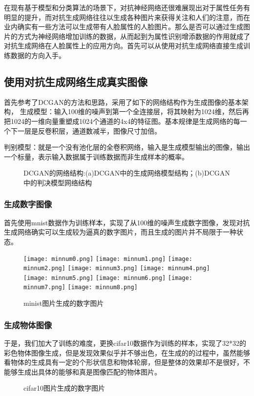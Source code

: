 在现有基于模型和分类算法的场景下，对抗神经网络还很难展现出对于属性任务有明显的提升，而对抗生成网络往往以生成各种图片来获得关注和人们的注意，而在业内确实有一些方法可以生成带有人脸属性的人脸图片。那么是否可以通过生成图片的方式为神经网络增加训练的数据，从而起到为属性识别增添数据的作用就成了对抗生成网络在人脸属性上的应用方向。首先可以从使用对抗生成网络直接生成训练数据的方向入手。
\subsection{使用对抗生成网络生成真实图像}
首先参考了DCGAN\cite{DCGAN}的方法和思路，采用了如下的网络结构作为生成图像的基本架构， 生成模型：输入100维的噪声到第一个全连接层，将其映射为1024维，然后再把1024的一维向量重塑成1024个通道的4x4的特征图。基本规律是生成网络的每一个下一层是反卷积层，通道数减半，图像尺寸加倍。

判别模型：就是一个没有池化层的全卷积网络，输入是生成模型输出的图像，输出一个标量，表示输入数据属于训练数据而非生成样本的概率。
\begin{figure}[h]
  \centering
  \caption{DCGAN的网络结构:(a)DCGAN中的生成网络模型结构；(b)DCGAN中的判决模型网络结构}
\end{figure}

\subsubsection{生成数字图像}
首先使用mnist数据\cite{MNIST}作为训练样本，实现了从100维的噪声生成数字图像，发现对抗生成网络确实可以生成较为逼真的数字图片，而且生成的图片并不局限于一种状态。
\begin{figure}[!ht]
 \centering 
	\texttt{[image: minnum0.png]}
	\texttt{[image: minnum1.png]}
	\texttt{[image: minnum2.png]}
	\texttt{[image: minnum3.png]}
	\texttt{[image: minnum4.png]}
	\texttt{[image: minnum5.png]}
	\texttt{[image: minnum6.png]}
	\texttt{[image: minnum7.png]}
	\texttt{[image: minnum8.png]}
	\caption{minist图片生成的数字图片}
\end{figure}

\subsubsection{生成物体图像}
于是，我们加大了训练的难度，更换cifar10\cite{CIFAR10}数据作为训练的样本，实现了32*32的彩色物体图像生成，但是发现效果似乎并不够出色，在生成的的过程中，虽然能够看物体的生成具有一定的个形状信息和物体轮廓，但是整体的效果却不是很好，不能够生成出具体的能够和真是图像匹配的物体图片。
\begin{figure}[!ht]
 \centering 
	\caption{cifar10图片生成的数字图片}
\end{figure}

